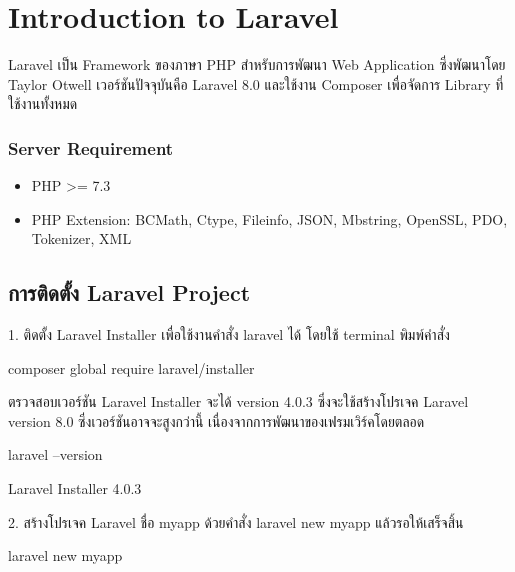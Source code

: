 \chapter{Introduction to Laravel}

Laravel เป็น Framework ของภาษา PHP สำหรับการพัฒนา Web Application 
ซึ่งพัฒนาโดย Taylor Otwell เวอร์ชันปัจจุบันคือ Laravel 8.0 
และใช้งาน Composer เพื่อจัดการ Library ที่ใช้งานทั้งหมด

\subsection{Server Requirement}
\begin{itemize}
    \item PHP >= 7.3
    \item PHP Extension: BCMath, Ctype, Fileinfo, JSON, Mbstring, OpenSSL, PDO, Tokenizer, XML
\end{itemize}

\section{การติดตั้ง Laravel Project}
1. ติดตั้ง Laravel Installer เพื่อใช้งานคำสั่ง laravel ได้ โดยใช้ terminal พิมพ์คำสั่ง
\begin{cli}{}
    composer global require laravel/installer
\end{cli}

ตรวจสอบเวอร์ชัน Laravel Installer จะได้ version 4.0.3 ซึ่งจะใช้สร้างโปรเจค Laravel version 8.0
ซึ่งเวอร์ชันอาจจะสูงกว่านี้ เนื่องจากการพัฒนาของเฟรมเวิร์คโดยตลอด
\begin{cli}{}
    laravel --version
\end{cli}

\begin{out}{}
    Laravel Installer 4.0.3
\end{out}

2. สร้างโปรเจค Laravel ชื่อ myapp ด้วยคำสั่ง laravel new myapp แล้วรอให้เสร็จสิ้น
\begin{cli}{}
    laravel new myapp
\end{cli}

